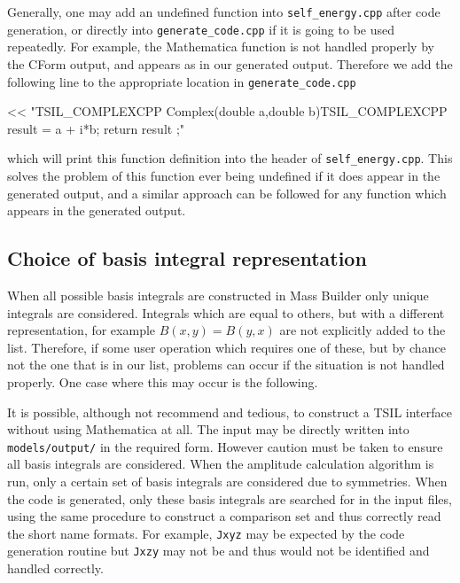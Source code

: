 Generally, one may add an undefined function into \lstinline{self_energy.cpp} after code generation, or directly into \lstinline{generate_code.cpp} if it is going to be used repeatedly.  For example, the Mathematica function  is not handled properly by the CForm output, and appears as  in our generated output.  Therefore we add the following line to the appropriate location in \lstinline{generate_code.cpp} 
\begin{lstterm}
<< "TSIL_COMPLEXCPP Complex(double a,double b){TSIL_COMPLEXCPP result = a + i*b; return result ;}\n"
\end{lstterm}
which will print this function definition into the header of \lstinline{self_energy.cpp}.  This solves the problem of this function ever being undefined if it does appear in the generated output, and a similar approach can be followed for any function which appears in the generated output.

\subsection{Choice of basis integral representation}

When all possible basis integrals are constructed in Mass Builder only unique integrals are considered.  Integrals which are equal to others, but with a different representation, for example $B(x,y) = B(y,x)$ are not explicitly added to the list.  Therefore, if some user operation which requires one of these, but by chance not the one that is in our list, problems can occur if the situation is not handled properly.  One case where this may occur is the following.

It is possible, although not recommend and tedious, to construct a TSIL interface without using Mathematica at all.  The input may be directly written into \lstinline{models/output/} in the required form.  However caution must be taken to ensure all basis integrals are considered.  When the amplitude calculation algorithm is run, only a certain set of basis integrals are considered due to symmetries.  When the code is generated, only these basis integrals are searched for in the input files, using the same procedure to construct a comparison set and thus correctly read the short name formats.  For example, \lstinline{Jxyz} may be expected by the code generation routine but \lstinline{Jxzy} may not be and thus would not be identified and handled correctly.



